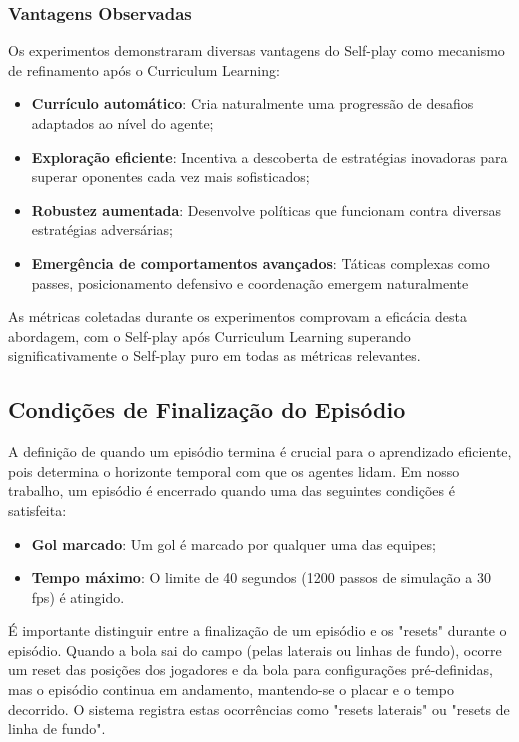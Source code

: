 \subsubsection{Vantagens Observadas}

Os experimentos demonstraram diversas vantagens do Self-play como mecanismo de refinamento após o Curriculum Learning:

\begin{itemize}
    \item \textbf{Currículo automático}: Cria naturalmente uma progressão de desafios adaptados ao nível do agente;
    \item \textbf{Exploração eficiente}: Incentiva a descoberta de estratégias inovadoras para superar oponentes cada vez mais sofisticados;
    \item \textbf{Robustez aumentada}: Desenvolve políticas que funcionam contra diversas estratégias adversárias;
    \item \textbf{Emergência de comportamentos avançados}: Táticas complexas como passes, posicionamento defensivo e coordenação emergem naturalmente
\end{itemize}

As métricas coletadas durante os experimentos comprovam a eficácia desta abordagem, com o Self-play após Curriculum Learning superando significativamente o Self-play puro em todas as métricas relevantes.

\subsection{Condições de Finalização do Episódio}

A definição de quando um episódio termina é crucial para o aprendizado eficiente, pois determina o horizonte temporal com que os agentes lidam. Em nosso trabalho, um episódio é encerrado quando uma das seguintes condições é satisfeita:

\begin{itemize}
    \item \textbf{Gol marcado}: Um gol é marcado por qualquer uma das equipes;
    \item \textbf{Tempo máximo}: O limite de 40 segundos (1200 passos de simulação a 30 fps) é atingido.
\end{itemize}

É importante distinguir entre a finalização de um episódio e os "resets" durante o episódio. Quando a bola sai do campo (pelas laterais ou linhas de fundo), ocorre um reset das posições dos jogadores e da bola para configurações pré-definidas, mas o episódio continua em andamento, mantendo-se o placar e o tempo decorrido. O sistema registra estas ocorrências como "resets laterais" ou "resets de linha de fundo".

